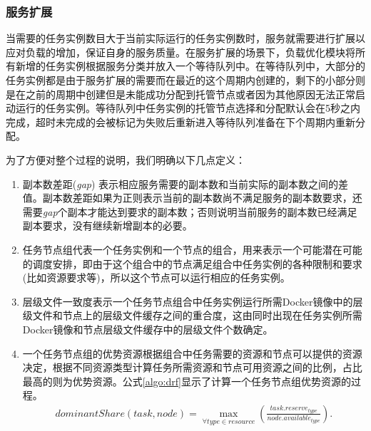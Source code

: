 \subsubsection{服务扩展}\label{sec:scaleout}
当需要的任务实例数目大于当前实际运行的任务实例数时，服务就需要进行扩展以应对负载的增加，保证自身的服务质量。在服务扩展的场景下，负载优化模块将所有新增的任务实例根据服务分类并放入一个等待队列中。在等待队列中，大部分的任务实例都是由于服务扩展的需要而在最近的这个周期内创建的，剩下的小部分则是在之前的周期中创建但是未能成功分配到托管节点或者因为其他原因无法正常启动运行的任务实例。等待队列中任务实例的托管节点选择和分配默认会在5秒之内完成，超时未完成的会被标记为失败后重新进入等待队列准备在下个周期内重新分配。

为了方便对整个过程的说明，我们明确以下几点定义：
\begin{enumerate}
\item 副本数差距(\emph{gap}) 表示相应服务需要的副本数和当前实际的副本数之间的差值。副本数差距如果为正则表示当前的副本数尚不满足服务的副本数要求，还需要\emph{gap}个副本才能达到要求的副本数；否则说明当前服务的副本数已经满足副本要求，没有继续新增副本的必要。
\item 任务节点组代表一个任务实例和一个节点的组合，用来表示一个可能潜在可能的调度安排，即由于这个组合中的节点满足组合中任务实例的各种限制和要求(比如资源要求等)，所以这个节点可以运行相应的任务实例。
\item 层级文件一致度表示一个任务节点组合中任务实例运行所需Docker镜像中的层级文件和节点上的层级文件缓存之间的重合度，这由同时出现在任务实例所需Docker镜像和节点层级文件缓存中的层级文件个数确定。
\item 一个任务节点组的优势资源根据组合中任务需要的资源和节点可以提供的资源决定，根据不同资源类型计算任务所需资源和节点可用资源之间的比例，占比最高的则为优势资源。公式\ref{algo:drf}显示了计算一个任务节点组优势资源的过程。
\begin{equation}\label{algo:drf}
\begin{split}
dominantShare({task}, {node}) = \max_{\forall type \in resource} {(\frac{task.reserve_{type}}{node.available_{type}})}.
\end{split}
\end{equation}
\end{enumerate}

